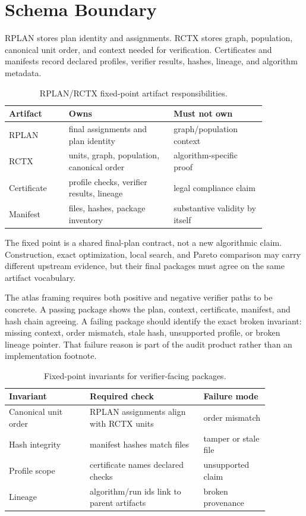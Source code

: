 \section{Schema Boundary}

RPLAN stores plan identity and assignments. RCTX stores graph, population,
canonical unit order, and context needed for verification. Certificates and
manifests record declared profiles, verifier results, hashes, lineage, and
algorithm metadata.

\begin{table}[htbp]
\centering
\small
\begin{tabular}{p{0.20\linewidth}p{0.35\linewidth}p{0.31\linewidth}}
\toprule
Artifact & Owns & Must not own \\
\midrule
RPLAN & final assignments and plan identity & graph/population context \\
RCTX & units, graph, population, canonical order & algorithm-specific proof \\
Certificate & profile checks, verifier results, lineage & legal compliance claim \\
Manifest & files, hashes, package inventory & substantive validity by itself \\
\bottomrule
\end{tabular}
\caption{RPLAN/RCTX fixed-point artifact responsibilities.}
\end{table}

The fixed point is a shared final-plan contract, not a new algorithmic claim.
Construction, exact optimization, local search, and Pareto comparison may carry
different upstream evidence, but their final packages must agree on the same
artifact vocabulary.

The atlas framing requires both positive and negative verifier paths to be
concrete. A passing package shows the plan, context, certificate, manifest, and
hash chain agreeing. A failing package should identify the exact broken
invariant: missing context, order mismatch, stale hash, unsupported profile, or
broken lineage pointer. That failure reason is part of the audit product rather
than an implementation footnote.

\begin{table}[htbp]
\centering
\small
\begin{tabular}{p{0.27\linewidth}p{0.38\linewidth}p{0.22\linewidth}}
\toprule
Invariant & Required check & Failure mode \\
\midrule
Canonical unit order & RPLAN assignments align with RCTX units & order mismatch \\
Hash integrity & manifest hashes match files & tamper or stale file \\
Profile scope & certificate names declared checks & unsupported claim \\
Lineage & algorithm/run ids link to parent artifacts & broken provenance \\
\bottomrule
\end{tabular}
\caption{Fixed-point invariants for verifier-facing packages.}
\end{table}

